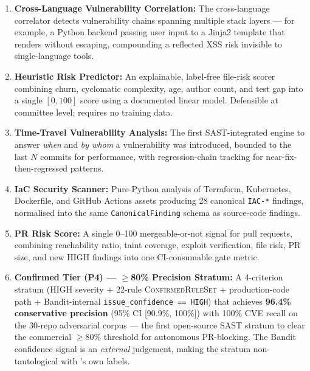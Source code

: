 \begin{enumerate}
  \item \textbf{Cross-Language Vulnerability Correlation:} The cross-language correlator detects vulnerability chains spanning multiple stack layers --- for example, a Python backend passing user input to a Jinja2 template that renders without escaping, compounding a reflected XSS risk invisible to single-language tools.

  \item \textbf{Heuristic Risk Predictor:} An explainable, label-free file-risk scorer combining churn, cyclomatic complexity, age, author count, and test gap into a single $[0,100]$ score using a documented linear model. Defensible at committee level; requires no training data.

  \item \textbf{Time-Travel Vulnerability Analysis:} The first SAST-integrated engine to answer \textit{when} and \textit{by whom} a vulnerability was introduced, bounded to the last $N$ commits for performance, with regression-chain tracking for near-fix-then-regressed patterns.

  \item \textbf{IaC Security Scanner:} Pure-Python analysis of Terraform, Kubernetes, Dockerfile, and GitHub Actions assets producing 28 canonical \texttt{IAC-*} findings, normalised into the same \texttt{CanonicalFinding} schema as source-code findings.

  \item \textbf{PR Risk Score:} A single 0--100 mergeable-or-not signal for pull requests, combining reachability ratio, taint coverage, exploit verification, file risk, PR size, and new HIGH findings into one CI-consumable gate metric.

  \item \textbf{Confirmed Tier (P4) --- $\geq$80\% Precision Stratum:} A 4-criterion stratum (HIGH severity + 22-rule \textsc{ConfirmedRuleSet} + production-code path + Bandit-internal \texttt{issue\_confidence == HIGH}) that achieves \textbf{96.4\% conservative precision} (95\% CI [90.9\%, 100\%]) with 100\% CVE recall on the 30-repo adversarial corpus --- the first open-source SAST stratum to clear the commercial $\geq$80\% threshold for autonomous PR-blocking. The Bandit confidence signal is an \emph{external} judgement, making the stratum non-tautological with \ACRQA{}'s own labels.


\end{enumerate}
